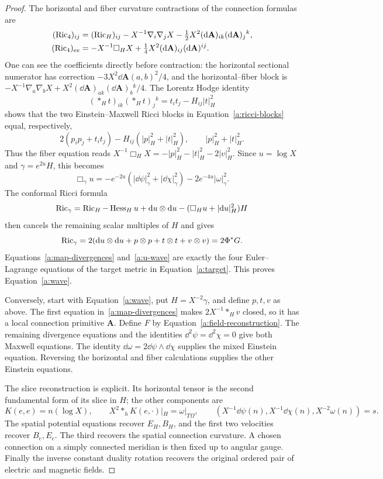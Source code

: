 \begin{proof}
The horizontal and fiber curvature contractions of the connection
formulas are
\begin{align}\label{a:ricci-blocks}
 (\operatorname{Ric}_4)_{ij}
   &=(\operatorname{Ric}_H)_{ij}-X^{-1}\nabla_i\nabla_jX
          -\tfrac12X^2(\mathrm d\mathbf A)_{ik}(\mathrm d\mathbf A)_j{}^k,
          \notag\\
 (\operatorname{Ric}_4)_{ee}
   &=-X^{-1}\Box_HX
          +\tfrac14X^2(\mathrm d\mathbf A)_{ij}(\mathrm d\mathbf A)^{ij}.
\end{align}
One can see the coefficients directly before contraction: the
horizontal sectional numerator has correction
$-3X^2\dd\mathbf A(a,b)^2/4$, and the horizontal--fiber
block is
$-X^{-1}\nabla_a\nabla_bX+
X^2(\dd\mathbf A)_{ak}(\dd\mathbf A)_b{}^k/4$.
The Lorentz Hodge identity
\[
 (*_Ht)_{ik}(*_Ht)_j{}^k=t_it_j-H_{ij}|t|_H^2
\]
shows that the two Einstein--Maxwell Ricci blocks in
Equation~\eqref{a:ricci-blocks} equal, respectively,
\[
 2(p_ip_j+t_it_j)-H_{ij}(|p|_H^2+|t|_H^2),
 \qquad |p|_H^2+|t|_H^2.
\]
Thus the fiber equation reads
$X^{-1}\Box_HX=-|p|_H^2-|t|_H^2-2|v|_H^2$.
Since $u=\log X$ and $\gamma=e^{2u}H$, this becomes
\begin{equation}\label{a:u-wave}
 \Box_\gamma u
  =-e^{-2u}(|\dd\psi|_\gamma^2+|\dd\chi|_\gamma^2)
       -2e^{-4u}|\omega|_\gamma^2.
\end{equation}
The conformal Ricci formula
\[
 \operatorname{Ric}_\gamma=\operatorname{Ric}_H-\operatorname{Hess}_Hu+\mathrm d u\otimes\mathrm d u
                -(\Box_Hu+|\mathrm d u|_H^2)H
\]
then cancels the remaining scalar multiples of $H$ and gives
\[
 \operatorname{Ric}_\gamma=2(\mathrm d u\otimes\mathrm d u+p\otimes p+t\otimes t+v\otimes v)
             =2\Phi^*G.
\]
Equations~\eqref{a:map-divergences} and~\eqref{a:u-wave}
are exactly the four Euler--Lagrange equations of the target
metric in Equation~\eqref{a:target}.  This proves
Equation~\eqref{a:wave}.

Conversely, start with Equation~\eqref{a:wave}, put
$H=X^{-2}\gamma$, and define $p,t,v$ as above.  The first
equation in~\eqref{a:map-divergences} makes
$2X^{-1}*_Hv$ closed, so it has a local connection primitive
$\mathbf A$.  Define $F$ by
Equation~\eqref{a:field-reconstruction}.  The remaining divergence
equations and the identities
$\dd^2\psi=\dd^2\chi=0$ give both Maxwell equations.
The identity $\dd\omega=2\dd\psi\wedge\dd\chi$ supplies
the mixed Einstein equation.  Reversing the horizontal and fiber
calculations supplies the other Einstein equations.

The slice reconstruction is explicit.  Its horizontal tensor is
the second fundamental form of its slice in $H$; the other
components are
\begin{equation}\label{a:reconstruction}
 K(e,e)=n(\log X),\qquad
 X^2*_hK(e,\cdot)|_H=\omega|_{T\Omega},\qquad
 (X^{-1}\dd\psi(n),X^{-1}\dd\chi(n),X^{-2}\omega(n))=s.
\end{equation}
The spatial potential equations recover $E_H,B_H$, and the first
two velocities recover $B_e,E_e$.  The third recovers the spatial
connection curvature.  A chosen connection on a simply connected
meridian is then fixed up to angular gauge.  Finally the inverse
constant duality rotation recovers the original ordered pair of
electric and magnetic fields.
\end{proof}

